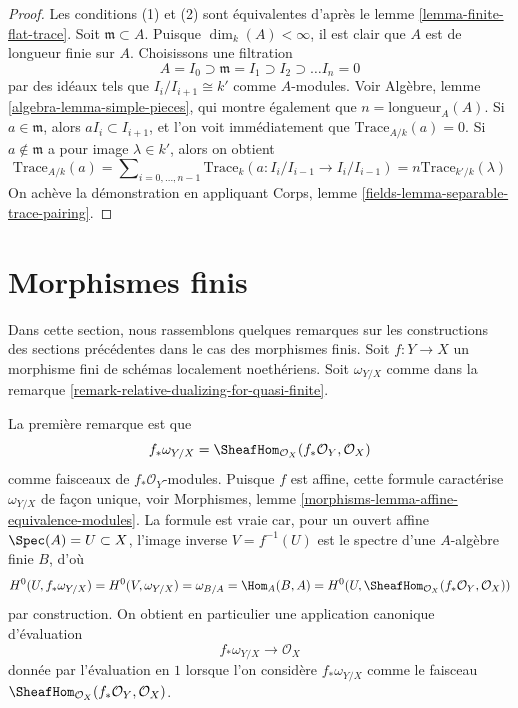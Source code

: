 \begin{proof}
Les conditions (1) et (2) sont équivalentes d'après le lemme \ref{lemma-finite-flat-trace}.
Soit $\mathfrak m \subset A$. Puisque $\dim_k(A) < \infty$, il est clair que
$A$ est de longueur finie sur $A$. Choisissons une filtration
$$
A = I_0 \supset \mathfrak m = I_1 \supset I_2 \supset \ldots I_n = 0
$$
par des idéaux tels que $I_i/I_{i + 1} \cong k'$ comme $A$-modules. Voir
Algèbre, lemme \ref{algebra-lemma-simple-pieces}, qui montre également que
$n = \text{longueur}_A(A)$. Si $a \in \mathfrak m$, alors $aI_i \subset I_{i + 1}$,
et l'on voit immédiatement que $\text{Trace}_{A/k}(a) = 0$.
Si $a \not \in \mathfrak m$ a pour image $\lambda \in k'$, alors
on obtient
$$
\text{Trace}_{A/k}(a) =
\sum\nolimits_{i = 0, \ldots, n - 1}
\text{Trace}_k(a : I_i/I_{i - 1} \to I_i/I_{i - 1}) =
n \text{Trace}_{k'/k}(\lambda)
$$
On achève la démonstration en appliquant
Corps, lemme \ref{fields-lemma-separable-trace-pairing}.
\end{proof}






\section{Morphismes finis}
\label{section-finite-morphisms}

\noindent
Dans cette section, nous rassemblons quelques remarques sur les
constructions des sections précédentes dans le cas des morphismes finis.
Soit $f : Y \to X$ un morphisme fini de schémas localement noethériens.
Soit $\omega_{Y/X}$ comme dans la
remarque \ref{remark-relative-dualizing-for-quasi-finite}.

\medskip\noindent
La première remarque est que
$$
f_*\omega_{Y/X} = \SheafHom_{\mathcal{O}_X}(f_*\mathcal{O}_Y, \mathcal{O}_X)
$$
comme faisceaux de $f_*\mathcal{O}_Y$-modules. Puisque $f$ est affine, cette
formule caractérise $\omega_{Y/X}$ de façon unique, voir
Morphismes, lemme \ref{morphisms-lemma-affine-equivalence-modules}.
La formule est vraie car, pour un ouvert affine $\Spec(A) = U \subset X$,
l'image inverse $V = f^{-1}(U)$ est le spectre d'une $A$-algèbre finie
$B$, d'où
$$
H^0(U, f_*\omega_{Y/X}) =
H^0(V, \omega_{Y/X}) =
\omega_{B/A} =
\Hom_A(B, A) =
H^0(U, \SheafHom_{\mathcal{O}_X}(f_*\mathcal{O}_Y, \mathcal{O}_X))
$$
par construction. On obtient en particulier une application canonique d'évaluation
$$
f_*\omega_{Y/X} \longrightarrow \mathcal{O}_X
$$
donnée par l'évaluation en $1$ lorsque l'on considère $f_*\omega_{Y/X}$
comme le faisceau $\SheafHom_{\mathcal{O}_X}(f_*\mathcal{O}_Y, \mathcal{O}_X)$.

